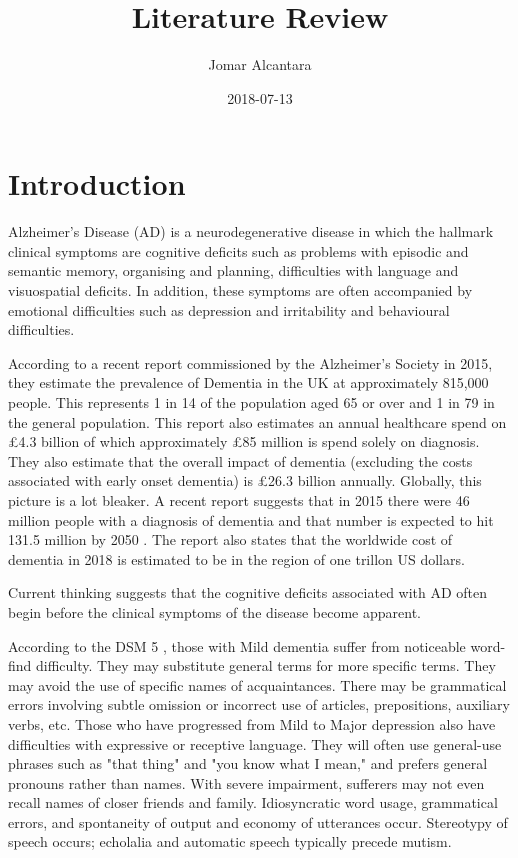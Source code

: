\documentclass[a4paper]{article}
\title{Literature Review}
\date{2018-07-13}
\author{Jomar Alcantara}
\begin{document}
\maketitle
\newpage
\tableofcontents
\newpage
\section{Introduction}
\par
Alzheimer's Disease (AD) is a neurodegenerative disease in which the hallmark clinical symptoms are cognitive deficits such as problems with episodic and semantic memory, organising and planning, difficulties with language and visuospatial deficits. In addition, these symptoms are often accompanied by emotional difficulties such as depression and irritability and behavioural difficulties. \newline
\par
According to a recent report commissioned by the Alzheimer's Society in 2015, they estimate the prevalence of Dementia in the UK at approximately 815,000 people. This represents 1 in 14 of the population aged 65 or over and 1 in 79 in the general population. This report also estimates an annual healthcare spend on £4.3 billion of which approximately £85 million is spend solely on diagnosis. They also estimate that the overall impact of dementia (excluding the costs associated with early onset dementia) is £26.3 billion annually. Globally, this picture is a lot bleaker. A recent report suggests that in 2015 there were 46 million people with a diagnosis of dementia and that number is expected to hit 131.5 million by 2050 \cite{Prince2015}. The report also states that the worldwide cost of dementia in 2018 is estimated to be in the region of one trillon US dollars. \newline
\par
Current thinking suggests that the cognitive deficits associated with AD often begin before the clinical symptoms of the disease become apparent. \newline
\par
According to the DSM 5 \cite{AmericanPsychiatricAssociation2013}, those with Mild dementia suffer from noticeable word-find difficulty. They may substitute general terms for more specific terms. They may avoid the use of specific names of acquaintances. There may be grammatical errors involving subtle omission or incorrect use of articles, prepositions, auxiliary verbs, etc. Those who have progressed from Mild to Major depression also have difficulties with expressive or receptive language. They will often use general-use phrases such as "that thing" and "you know what I mean," and prefers general pronouns rather than names. With severe impairment, sufferers may not even recall names of closer friends and family. Idiosyncratic word usage, grammatical errors, and spontaneity of output and economy of utterances occur. Stereotypy of speech occurs; echolalia and automatic speech typically precede mutism.\newline
\end{document}
